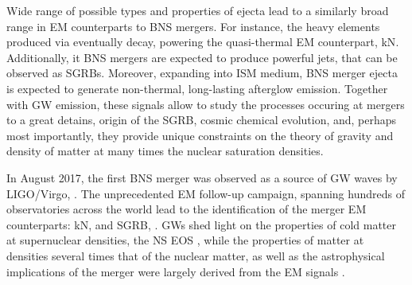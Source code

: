 Wide range of possible types and properties of ejecta lead to a similarly broad 
range in \ac{EM} counterparts to \ac{BNS} mergers. For instance, the heavy elements 
produced via \rproc{} \nuc{} eventually decay, powering the quasi-thermal \ac{EM} 
counterpart, \ac{kN}. Additionally, it \ac{BNS} mergers are expected to produce 
powerful jets, that can be observed as \acp{SGRB}. Moreover, expanding into \ac{ISM} 
medium, \ac{BNS} merger ejecta is expected to generate non-thermal, long-lasting 
afterglow emission. 
Together with \ac{GW} emission, these signals allow to study the processes occuring 
at mergers to a great detains, origin of the \ac{SGRB}, cosmic chemical evolution, 
and, perhaps most importantly, they provide unique constraints on the theory of gravity 
and density of matter at many times the nuclear saturation densities. 



In August 2017, the first \ac{BNS} merger was observed 
as a source of \ac{GW} waves by \ac{LIGO}/Virgo, \GW{}. The unprecedented \ac{EM} 
follow-up campaign, spanning hundreds of observatories across the world lead to 
the identification of the merger \ac{EM} counterparts: \ac{kN}, \AT{} and 
\ac{SGRB}, \GRB{} 
\citep{TheLIGOScientific:2017qsa,Abbott:2018wiz,GBM:2017lvd}. 
%
\acp{GW} shed light on the properties of cold matter 
at supernuclear densities, the \ac{NS} \ac{EOS} 
\citep{Hinderer:2009ca,Damour:2012yf,DelPozzo:2013ala}, while 
the properties of matter at densities several times that of the 
nuclear matter, as well as the astrophysical implications of the merger 
were largely derived from the \ac{EM} signals 
\cite{Alexander:2017aly,Villar:2017wcc,Hajela:2019mjy}. 


